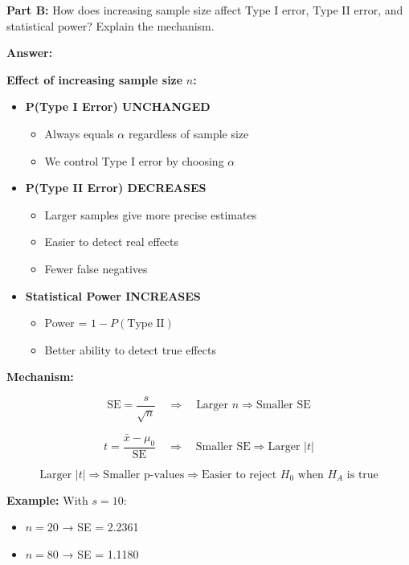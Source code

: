 \documentclass[11pt]{article}
\begin{document}
\vspace{6pt}

\textbf{Part B:} How does increasing sample size affect Type I error, Type II error, and statistical power? Explain the mechanism.

\textcolor{answergreen}{\textbf{Answer:}}

\textbf{Effect of increasing sample size} $n$\textbf{:}

\begin{itemize}
\item \textbf{P(Type I Error) UNCHANGED}
  \begin{itemize}
  \item Always equals $\alpha$ regardless of sample size
  \item We control Type I error by choosing $\alpha$
  \end{itemize}

\item \textbf{P(Type II Error) DECREASES}
  \begin{itemize}
  \item Larger samples give more precise estimates
  \item Easier to detect real effects
  \item Fewer false negatives
  \end{itemize}

\item \textbf{Statistical Power INCREASES}
  \begin{itemize}
  \item Power = $1 - P(\text{Type II})$
  \item Better ability to detect true effects
  \end{itemize}
\end{itemize}

\textbf{Mechanism:}

$$\text{SE} = \frac{s}{\sqrt{n}} \quad \Rightarrow \quad \text{Larger } n \Rightarrow \text{Smaller SE}$$

$$t = \frac{\bar{x} - \mu_0}{\text{SE}} \quad \Rightarrow \quad \text{Smaller SE} \Rightarrow \text{Larger } |t|$$

$$\text{Larger } |t| \Rightarrow \text{Smaller p-values} \Rightarrow \text{Easier to reject } H_0 \text{ when } H_A \text{ is true}$$

\textbf{Example:} With $s = 10$:
\begin{itemize}
\item $n = 20$ → SE = 2.2361
\item $n = 80$ → SE = 1.1180
\end{itemize}
\end{document}
